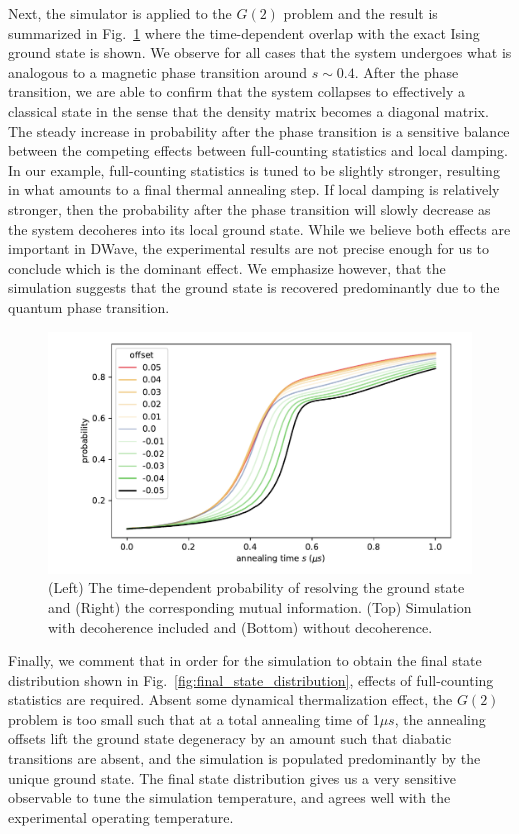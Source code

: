 \documentclass[prd,twocolumn,tightenlines,preprintnumbers,showpacs,superscriptaddress,notitlepage,nofootinbib,eqsecnum,floatfix,longbibliography,aps,10pt]{revtex4-2}
\begin{document}
Next, the simulator is applied to the $G(2)$ problem and the result is summarized in Fig.~\ref{fig:td_prob} where the time-dependent overlap with the exact Ising ground state is shown. We observe for all cases that the system undergoes what is analogous to a magnetic phase transition around $s\sim 0.4$.
After the phase transition, we are able to confirm that the system collapses to effectively a classical state in the sense that the density matrix becomes a diagonal matrix.
The steady increase in probability after the phase transition is a sensitive balance between the competing effects between full-counting statistics and local damping.
In our example, full-counting statistics is tuned to be slightly stronger, resulting in what amounts to a final thermal annealing step.
If local damping is relatively stronger, then the probability after the phase transition will slowly decrease as the system decoheres into its local ground state.
While we believe both effects are important in DWave, the experimental results are not precise enough for us to conclude which is the dominant effect.
We emphasize however, that the simulation suggests that the ground state is recovered predominantly due to the quantum phase transition.

\begin{figure}
	\centering
	\includegraphics[width=\columnwidth]{./new_figures/time_dependent_probability.pdf}
	\caption{(Left) The time-dependent probability of resolving the ground state and (Right) the corresponding mutual information. (Top) Simulation with decoherence included and (Bottom) without decoherence.}
	\label{fig:td_prob}
\end{figure}

Finally, we comment that in order for the simulation to obtain the final state distribution shown in Fig.~\ref{fig:final_state_distribution}, effects of full-counting statistics are required.
Absent some dynamical thermalization effect, the $G(2)$ problem is too small such that at a total annealing time of 1$\mu s$, the annealing offsets lift the ground state degeneracy by an amount such that diabatic transitions are absent, and the simulation is populated predominantly by the unique ground state.
The final state distribution gives us a very sensitive observable to tune the simulation temperature, and agrees well with the experimental operating temperature.
\end{document}
